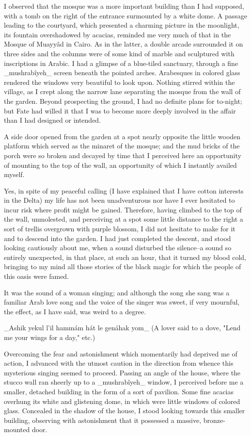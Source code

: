 I observed that the mosque was a more important building than I had
supposed, with a tomb on the right of the entrance surmounted by a
white dome. A passage leading to the courtyard, which presented a
charming picture in the moonlight, its fountain overshadowed by
acacias, reminded me very much of that in the Mosque of Muayyâd in
Cairo. As in the latter, a double arcade surrounded it on three sides
and the columns were of some kind of marble and sculptured with
inscriptions in Arabic. I had a glimpse of a blue-tiled sanctuary,
through a fine _mushrabîyeh_ screen beneath the pointed arches.
Arabesques in colored glass rendered the windows very beautiful to
look upon. Nothing stirred within the village, as I crept along the
narrow lane separating the mosque from the wall of the garden. Beyond
prospecting the ground, I had no definite plans for to-night; but Fate
had willed it that I was to become more deeply involved in the affair
than I had designed or intended.

A side door opened from the garden at a spot nearly opposite the
little wooden platform which served as the minaret of the mosque; and
the mud bricks of the porch were so broken and decayed by time that I
perceived here an opportunity of mounting to the top of the wall, an
opportunity of which I instantly availed myself.

Yes, in spite of my peaceful calling (I have explained that I have
cotton interests in the Delta) my life has not been unadventurous nor
have I ever hesitated to incur risk where profit might be gained.
Therefore, having climbed to the top of the wall, unmolested, and
perceiving at a spot some little distance to the right a sort of
trellis overgrown with purple blossom, I did not hesitate to make for
it and to descend into the garden. I had just completed the descent,
and stood looking cautiously about me, when a sound disturbed the
silence--a sound so entirely unexpected, in that place, at such an
hour, that it turned my blood cold, bringing to my mind all those
stories of the black magic for which the people of this oasis were
famed.

It was the sound of a woman singing; and although the song she sang
was a familiar Arab love song and the voice of the singer was sweet,
if very mournful, the effect, as I have said, was weird to a degree.

    _Ashik yekul l'il hammám hát le genáhak yom_
    (A lover said to a dove, "Lend me your wings for a day," etc.)

Overcoming the fear and astonishment which momentarily had deprived
me of action, I advanced with the utmost caution in the direction from
whence this mysterious singing seemed to proceed. Passing an angle of
the house, where the stucco wall ran sheerly up to a _mushrabîyeh_
window, I perceived before me a smaller, detached building in the form
of a sort of pavilion. Some fine acacias overhung its white and
glistening dome, in which were little windows of colored glass.
Concealed in the shadow of the house, I stood looking towards this
smaller building, observing with astonishment that it possessed a
massive, bronze-mounted door.

